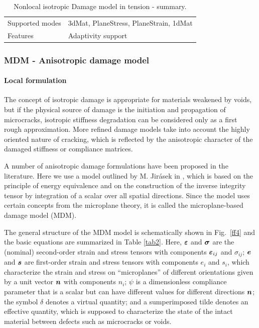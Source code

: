 \documentclass[epsf,a4paper]{article}
\newcommand{\mbf}[1]{\mbox{\boldmath$#1$}}
\newcommand {\eps} {\mbf{\varepsilon}}
\newcommand{\ve}{\mbf{e}}             %
\newcommand{\veps}{\mbf{\varepsilon}}        %
\newcommand{\vsig}{\mbf{\sigma}}             %
\newcommand{\vs}{\mbf{s}}             %
\begin{document}
\begin{table}[h]
\begin{tabular}{|l|p{9cm}|}
Supported modes& 3dMat, PlaneStress, PlaneStrain, 1dMat\\
Features & Adaptivity support\\
\hline
\end{tabular}                                                                   
\caption{Nonlocal isotropic Damage model in tension - summary.}                
\label{idnl_table}                                                         
\end{table}                                                                     

\subsubsection{MDM - Anisotropic damage model}

\paragraph{Local formulation}

The concept of isotropic damage is appropriate for materials weakened
by voids, but if the physical source of damage is the initiation and
propagation of microcracks, isotropic stiffness degradation 
can be considered only as a first rough
approximation. More refined damage models take into account the highly
oriented nature of cracking, which is reflected by the anisotropic
character of the damaged stiffness or compliance matrices.

A number of anisotropic damage formulations have been proposed
in the literature. Here we use a model outlined by M. Jir\'{a}sek
in \cite{mdm}, which is based on the principle of energy
equivalence and on the construction of the inverse integrity
tensor by integration of a scalar over all spatial directions. 
Since the model uses certain concepts from the
microplane theory, it is called the microplane-based damage model (MDM).

The general structure of the MDM 
model is schematically shown in Fig.\ \ref{ff4}
and the basic equations are summarized in Table \ref{tab2}.
Here, $\veps$ and $\vsig$ are the (nominal) second-order 
strain and stress tensors
with components $\eps_{ij}$ and $\sigma_{ij}$; $\ve$ and $\vs$
are first-order strain and stress tensors with components $e_i$
and $s_i$, which characterize the strain and stress on ``microplanes''
of different orientations given by a unit vector $\mbf{n}$
with components $n_i$;
$\psi$ is a dimensionless compliance parameter 
that is a scalar but can have different values for different 
directions $\mbf{n}$;
the symbol $\delta$ denotes a virtual quantity; and a sumperimposed
tilde denotes an effective quantity, which is supposed to characterize the
state of the intact material between defects such as microcracks or voids.
\end{document}

